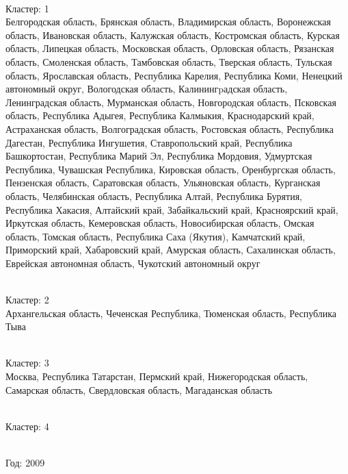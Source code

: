 \documentclass[11pt]{article}
\begin{document}
\newline \\ Кластер:  1
\\ Белгородская область, Брянская область, Владимирская область, Воронежская область, Ивановская область, Калужская область, Костромская область, Курская область, Липецкая область, Московская область, Орловская область, Рязанская область, Смоленская область, Тамбовская область, Тверская область, Тульская область, Ярославская область, Республика Карелия, Республика Коми, Ненецкий автономный округ, Вологодская область, Калинингpадская область, Ленинградская область, Мурманская область, Новгородская область, Псковская область, Республика Адыгея, Республика Калмыкия, Краснодарский край, Астраханская область, Волгоградская область, Ростовская область, Республика Дагестан, Республика Ингушетия, Ставропольский край, Республика Башкортостан, Республика Марий Эл, Республика Мордовия, Удмуртская Республика, Чувашская Республика, Кировская область, Оренбургская область, Пензенская область, Саратовская область, Ульяновская область, Курганская область, Челябинская область, Республика Алтай, Республика Бурятия, Республика Хакасия, Алтайский край, Забайкальский край, Красноярский край, Иркутская область, Кемеровская область, Новосибирская область, Омская область, Томская область, Республика Саха (Якутия), Камчатский край, Приморский край, Хабаровский край, Амурская область, Сахалинская область, Еврейская автономная область, Чукотский автономный округ

\newline \\ Кластер:  2
\\ Архангельская область, Чеченская Республика, Тюменская область, Республика Тыва

\newline \\ Кластер:  3
\\ Москва, Республика Татарстан, Пермский край, Нижегородская область, Самарская область, Свердловская область, Магаданская область

\newline \\ Кластер:  4



\newline \newline \\ Год:  2009
\end{document}
